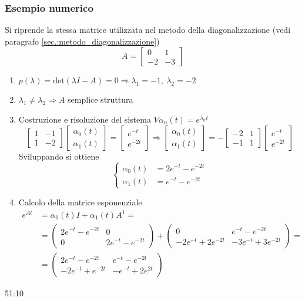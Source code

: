 \subsubsection{Esempio numerico}
Si riprende la stessa matrice utilizzata nel metodo della diagonalizzazione
(vedi paragrafo \ref{sec.:metodo_diagonalizzazione})
$$
A = \begin{bmatrix}
0 & 1\\
-2 & -3
\end{bmatrix}
$$
\begin{enumerate}
\item $p(\lambda) = \text{det} (\lambda I -A) = 0\Rightarrow \lambda_1 = -1,\
\lambda_2 = -2$
\item $\lambda_1\neq \lambda_2 \Rightarrow A $ semplice struttura
\item Costruzione e risoluzione del sistema $V\alpha_n(t) = e^{\lambda_n t}$
$$
\begin{bmatrix}
1 & -1 \\
1 & -2
\end{bmatrix}\begin{bmatrix}
\alpha_0(t) \\ \alpha_1 (t)
\end{bmatrix} =
\begin{bmatrix}
e^{-t} \\
e^{-2t}
\end{bmatrix}\Rightarrow \begin{bmatrix}
\alpha_0(t) \\ \alpha_1 (t)
\end{bmatrix} = - \begin{bmatrix}
-2 & 1 \\
-1 & 1
\end{bmatrix}\begin{bmatrix}
e^{-t} \\ e^{-2t}
\end{bmatrix}
$$
Sviluppando si ottiene
$$\left\{\begin{aligned}
\alpha_0(t) &= 2e^{-t} - e^{-2t}\\
\alpha_1(t) &= e^{-t} -e^{-2t}
\end{aligned}\right.$$
\item Calcolo della matrice esponenziale
$$\begin{aligned}
e^{At} &= \alpha_0(t)I + \alpha_1(t) A^1 =\\
&=\begin{pmatrix}
2e^{-t}-e^{-2t} & 0 \\
0 & 2e^{-t}-e^{-2t}
\end{pmatrix} + \begin{pmatrix}
0 & e^{-t}-e^{-2t} \\
-2e^{-t}+2e^{-2t} & -3e^{-t} + 3e^{-2t}
\end{pmatrix} =\\
&= \begin{pmatrix}
2e^{-t}-e^{-2t} & e^{-t}-e^{-2t}\\
-2e^{-t} + e^{-2t} & -e^{-t}+2e^{2t}
\end{pmatrix}
\end{aligned}$$
\end{enumerate}
51:10
